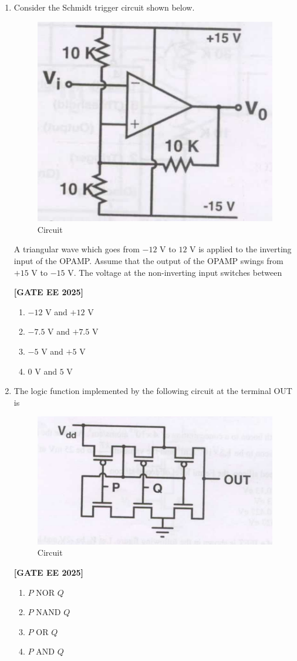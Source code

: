 \documentclass[12pt]{article}
\begin{document}
\begin{enumerate}[leftmargin=*, label=\textbf{Q.\arabic*:}]
\item Consider the Schmidt trigger circuit shown below.

\begin{figure}[H]\centering
\includegraphics[width=0.5\columnwidth]{figs/q53.png}
\caption{Circuit}
\label{fig:q53}
\end{figure}

A triangular wave which goes from $-12$ V to $12$ V is applied to the inverting input of the OPAMP. Assume that the output of the OPAMP swings from $+15$ V to $-15$ V. The voltage at the non-inverting input switches between
 
\noindent \textbf{[GATE EE 2025]}
\begin{enumerate}
    \item $-12$ V and $+12$ V
    \item $-7.5$ V and $+7.5$ V
    \item $-5$ V and $+5$ V
    \item $0$ V and $5$ V
\end{enumerate}

\item The logic function implemented by the following circuit at the terminal OUT is
\begin{figure}[H]\centering
\includegraphics[width=0.6\columnwidth]{figs/q54.png}
\caption{Circuit}
\label{fig:q54}
\end{figure}
 
\noindent \textbf{[GATE EE 2025]}
\begin{enumerate}
    \item $P$ NOR $Q$
    \item $P$ NAND $Q$
    \item $P$ OR $Q$
    \item $P$ AND $Q$
\end{enumerate}


\end{enumerate}
\end{document}
